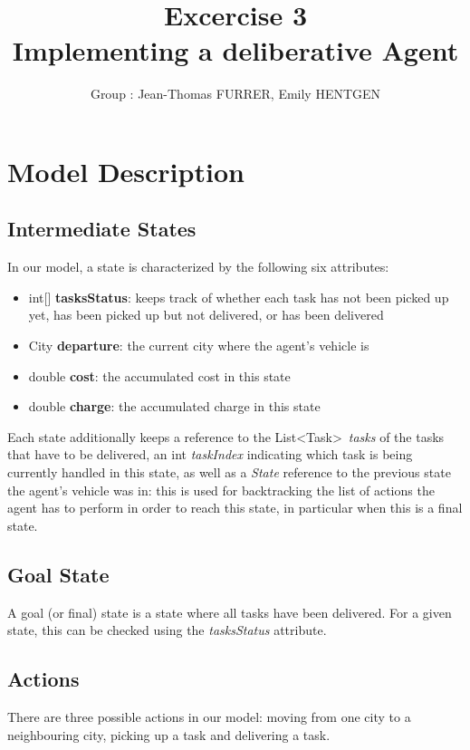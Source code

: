 \documentclass[10pt]{article}
\title{\bf Excercise 3\\ Implementing a deliberative Agent}
\author{Group \textnumero 23: Jean-Thomas FURRER, Emily HENTGEN}
\begin{document}
\maketitle

\section{Model Description}

\subsection{Intermediate States}
In our model, a state is characterized by the following six attributes:
\begin{itemize}
\itemsep 0mm
\item[\textendash]int[] \textbf{tasksStatus}: keeps track of whether each task has not been picked up yet, has been picked up but not delivered, or has been delivered
\item[\textendash]City \textbf{departure}: the current city where the agent's vehicle is
\item[\textendash]double \textbf{cost}: the accumulated cost in this state
\item[\textendash]double \textbf{charge}: the accumulated charge in this state
\end{itemize}

\noindent
Each state additionally keeps a reference to the List\textless Task\textgreater\ \textit{tasks} of the tasks that have to be delivered, an int \textit{taskIndex} indicating which task is being currently handled in this state, as well as a \textit{State} reference to the previous state the agent's vehicle was in: this is used for backtracking the list of actions the agent has to perform in order to reach this state, in particular when this is a final state.

\subsection{Goal State}
A goal (or final) state is a state where all tasks have been delivered. For a given state, this can be checked using the \textit{tasksStatus} attribute.

\subsection{Actions}
There are three possible actions in our model: moving from one city to a neighbouring city, picking up a task and delivering a task.
\end{document}
